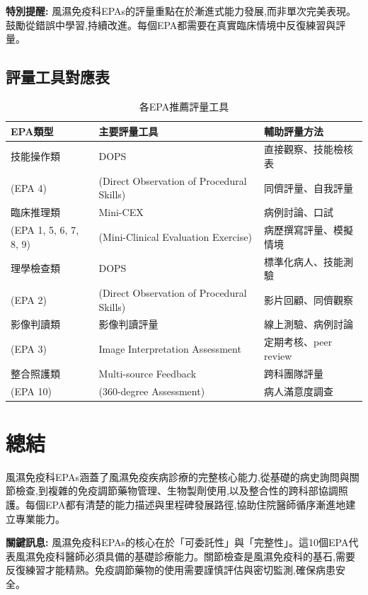 \documentclass[12pt,a4paper]{article}
\begin{document}
\begin{importantbox}
\textbf{特別提醒:} 風濕免疫科EPAs的評量重點在於漸進式能力發展,而非單次完美表現。鼓勵從錯誤中學習,持續改進。每個EPA都需要在真實臨床情境中反復練習與評量。
\end{importantbox}

\subsection{評量工具對應表}
\begin{table}[h]
    \centering
    \caption{各EPA推薦評量工具}
    \begin{tabular}{p{4.5cm} p{4cm} p{5.5cm}}
        \toprule
        \textbf{EPA類型} & \textbf{主要評量工具} & \textbf{輔助評量方法} \\
        \midrule
        技能操作類 & DOPS & 直接觀察、技能檢核表 \\
        (EPA 4) & (Direct Observation of Procedural Skills) & 同儕評量、自我評量 \\
        \midrule
        臨床推理類 & Mini-CEX & 病例討論、口試 \\
        (EPA 1, 5, 6, 7, 8, 9) & (Mini-Clinical Evaluation Exercise) & 病歷撰寫評量、模擬情境 \\
        \midrule
        理學檢查類 & DOPS & 標準化病人、技能測驗 \\
        (EPA 2) & (Direct Observation of Procedural Skills) & 影片回顧、同儕觀察 \\
        \midrule
        影像判讀類 & 影像判讀評量 & 線上測驗、病例討論 \\
        (EPA 3) & Image Interpretation Assessment & 定期考核、peer review \\
        \midrule
        整合照護類 & Multi-source Feedback & 跨科團隊評量 \\
        (EPA 10) & (360-degree Assessment) & 病人滿意度調查 \\
        \bottomrule
    \end{tabular}
\end{table}

\section{總結}

風濕免疫科EPAs涵蓋了風濕免疫疾病診療的完整核心能力,從基礎的病史詢問與關節檢查,到複雜的免疫調節藥物管理、生物製劑使用,以及整合性的跨科部協調照護。每個EPA都有清楚的能力描述與里程碑發展路徑,協助住院醫師循序漸進地建立專業能力。

\begin{importantbox}
\textbf{關鍵訊息:} 風濕免疫科EPAs的核心在於「可委託性」與「完整性」。這10個EPA代表風濕免疫科醫師必須具備的基礎診療能力。關節檢查是風濕免疫科的基石,需要反復練習才能精熟。免疫調節藥物的使用需要謹慎評估與密切監測,確保病患安全。
\end{importantbox}
\end{document}
